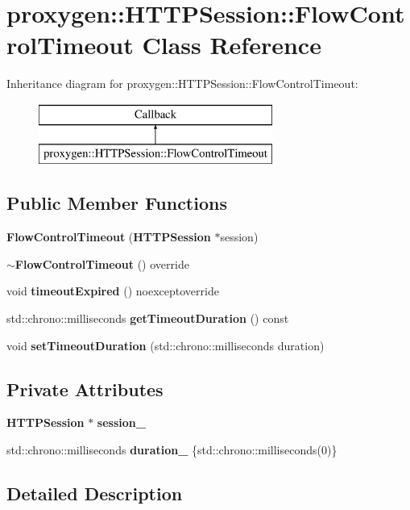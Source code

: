 \section{proxygen\+:\+:H\+T\+T\+P\+Session\+:\+:Flow\+Control\+Timeout Class Reference}
\label{classproxygen_1_1HTTPSession_1_1FlowControlTimeout}
Inheritance diagram for proxygen\+:\+:H\+T\+T\+P\+Session\+:\+:Flow\+Control\+Timeout\+:\begin{figure}[H]
\begin{center}
\leavevmode
\includegraphics[height=2.000000cm]{classproxygen_1_1HTTPSession_1_1FlowControlTimeout}
\end{center}
\end{figure}
\subsection*{Public Member Functions}
\begin{DoxyCompactItemize}
\item 
{\bf Flow\+Control\+Timeout} ({\bf H\+T\+T\+P\+Session} $\ast$session)
\item 
{\bf $\sim$\+Flow\+Control\+Timeout} () override
\item 
void {\bf timeout\+Expired} () noexceptoverride
\item 
std\+::chrono\+::milliseconds {\bf get\+Timeout\+Duration} () const 
\item 
void {\bf set\+Timeout\+Duration} (std\+::chrono\+::milliseconds duration)
\end{DoxyCompactItemize}
\subsection*{Private Attributes}
\begin{DoxyCompactItemize}
\item 
{\bf H\+T\+T\+P\+Session} $\ast$ {\bf session\+\_\+}
\item 
std\+::chrono\+::milliseconds {\bf duration\+\_\+} \{std\+::chrono\+::milliseconds(0)\}
\end{DoxyCompactItemize}


\subsection{Detailed Description}



